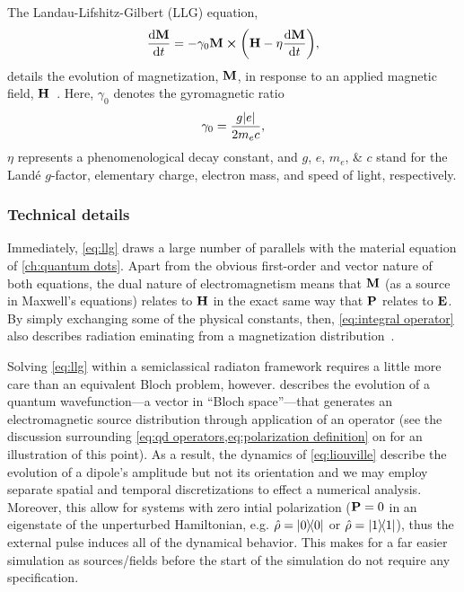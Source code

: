 The Landau-Lifshitz-Gilbert (LLG) equation,
\begin{equation}
  \dv{\vb{M}}{t} = -\gamma_0 \vb{M} \cp \qty(\vb{H} - \eta \dv{\vb{M}}{t}),
  \label{eq:llg}
\end{equation}
details the evolution of magnetization, $\vb{M}$, in response to an applied magnetic field, $\vb{H}$~\cite{Aharoni2000}.
Here, $\gamma_0$ denotes the gyromagnetic ratio
\begin{equation}
  \gamma_0 = \frac{g \abs{e}}{2 m_e c},
  \label{eq:gyro}
\end{equation}
$\eta$ represents a phenomenological decay constant, and $g$, $e$, $m_e$, \& $c$ stand for the Land\'e $g$-factor, elementary charge, electron mass, and speed of light, respectively.

\subsubsection{Technical details}

Immediately, \cref{eq:llg} draws a large number of parallels with the material equation of  \cref{ch:quantum dots}.
Apart from the obvious first-order and vector nature of both equations, the dual nature of electromagnetism means that $\vb{M}$ (as a source in Maxwell's equations) relates to $\vb{H}$ in the exact same way that $\vb{P}$ relates to $\vb{E}$.
By simply exchanging some of the physical constants, then, \cref{eq:integral operator} also describes radiation eminating from a magnetization distribution~\cite{Rothwell2009}.

Solving \cref{eq:llg} within a semiclassical radiaton framework requires a little more care than an equivalent Bloch problem, however.
 describes the evolution of a quantum wavefunction---a vector in ``Bloch space''---that generates an electromagnetic source distribution through application of an operator (see the discussion surrounding \cref{eq:qd operators,eq:polarization definition} on  for an illustration of this point).
As a result, the dynamics of \cref{eq:liouville} describe the evolution of a dipole's amplitude but not its orientation and we may employ separate spatial and temporal discretizations to effect a numerical analysis.
Moreover, this allow for systems with zero intial polarization ($\vb{P} = 0$ in an eigenstate of the unperturbed Hamiltonian, e.g. $\hat{\rho} = \op{0}{0}$ or $\hat{\rho} = \op{1}{1}$), thus the external pulse induces all of the dynamical behavior.
This makes for a far easier simulation as sources/fields before the start of the simulation do not require any specification.

